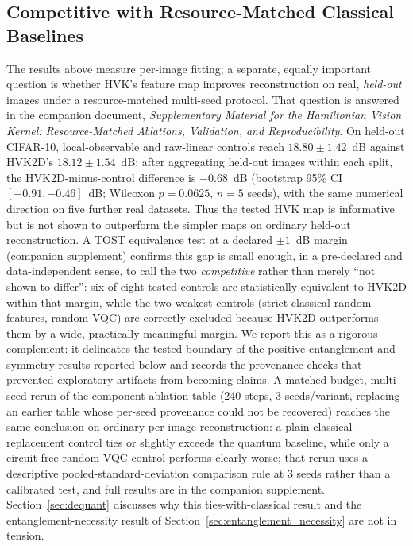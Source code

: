 \documentclass[sn-mathphys,Numbered]{sn-jnl}
\begin{document}
\subsection{Competitive with Resource-Matched Classical Baselines}
\label{sec:ablation_relationship}
The results above measure per-image fitting; a separate, equally important question is whether HVK's feature map improves reconstruction on real, \emph{held-out} images under a resource-matched multi-seed protocol. That question is answered in the companion document, \textit{Supplementary Material for the Hamiltonian Vision Kernel: Resource-Matched Ablations, Validation, and Reproducibility}. On held-out CIFAR-10, local-observable and raw-linear controls reach $18.80\pm1.42$~dB against HVK2D's $18.12\pm1.54$~dB; after aggregating held-out images within each split, the HVK2D-minus-control difference is $-0.68$~dB (bootstrap 95\% CI $[-0.91,-0.46]$~dB; Wilcoxon $p=0.0625$, $n=5$ seeds), with the same numerical direction on five further real datasets. Thus the tested HVK map is informative but is not shown to outperform the simpler maps on ordinary held-out reconstruction. A TOST equivalence test at a declared $\pm1$~dB margin (companion supplement) confirms this gap is small enough, in a pre-declared and data-independent sense, to call the two \emph{competitive} rather than merely ``not shown to differ'': six of eight tested controls are statistically equivalent to HVK2D within that margin, while the two weakest controls (strict classical random features, random-VQC) are correctly excluded because HVK2D outperforms them by a wide, practically meaningful margin. We report this as a rigorous complement: it delineates the tested boundary of the positive entanglement and symmetry results reported below and records the provenance checks that prevented exploratory artifacts from becoming claims. A matched-budget, multi-seed rerun of the component-ablation table (240 steps, 3 seeds/variant, replacing an earlier table whose per-seed provenance could not be recovered) reaches the same conclusion on ordinary per-image reconstruction: a plain classical-replacement control ties or slightly exceeds the quantum baseline, while only a circuit-free random-VQC control performs clearly worse; that rerun uses a descriptive pooled-standard-deviation comparison rule at 3 seeds rather than a calibrated test, and full results are in the companion supplement. Section~\ref{sec:dequant} discusses why this ties-with-classical result and the entanglement-necessity result of Section~\ref{sec:entanglement_necessity} are not in tension.
\end{document}

